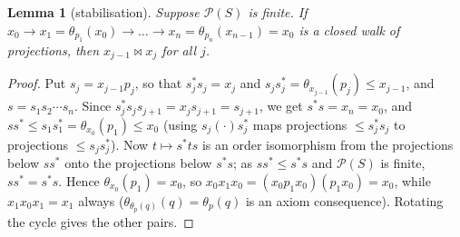 \documentclass[11pt]{amsart}
\newtheorem{lemma}[theorem]{Lemma}
\theoremstyle{definition}
\renewcommand{\P}{\mathcal{P}}
\begin{document}
\begin{lemma}[stabilisation]\label{lem:stab}
Suppose $\P(S)$ is finite. If $x_0\to x_1=\theta_{p_1}(x_0)\to\dots\to x_n=\theta_{p_n}(x_{n-1})=x_0$ is a closed walk of projections, then $x_{j-1}\bowtie x_j$ for all $j$.
\end{lemma}
\begin{proof}
Put $s_j=x_{j-1}p_j$, so that $s_j^*s_j=x_j$ and $s_js_j^*=\theta_{x_{j-1}}(p_j)\le x_{j-1}$, and $s=s_1s_2\cdots s_n$. Since $s_j^*s_js_{j+1}=x_js_{j+1}=s_{j+1}$, we get $s^*s=x_n=x_0$, and $ss^*\le s_1s_1^*=\theta_{x_0}(p_1)\le x_0$ (using $s_j(\cdot)s_j^*$ maps projections $\le s_j^*s_j$ to projections $\le s_js_j^*$). Now $t\mapsto s^*ts$ is an order isomorphism from the projections below $ss^*$ onto the projections below $s^*s$; as $ss^*\le s^*s$ and $\P(S)$ is finite, $ss^*=s^*s$. Hence $\theta_{x_0}(p_1)=x_0$, so $x_0x_1x_0=(x_0p_1x_0)(p_1x_0)=x_0$, while $x_1x_0x_1=x_1$ always ($\theta_{\theta_p(q)}(q)=\theta_p(q)$ is an axiom consequence). Rotating the cycle gives the other pairs.
\end{proof}
\end{document}
